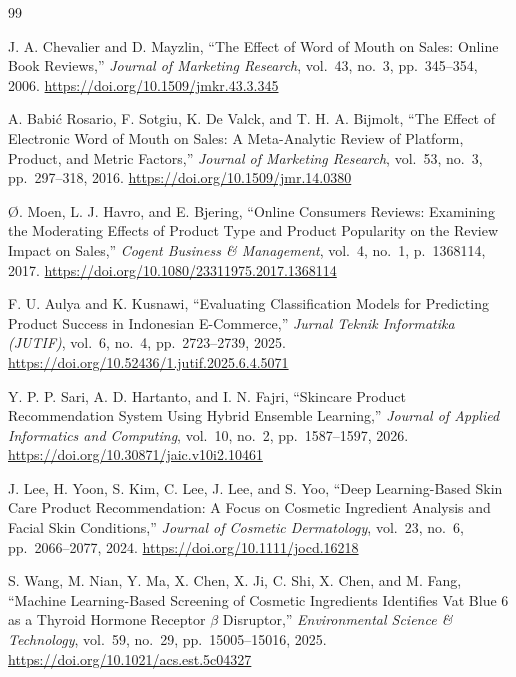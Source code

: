 \begin{thebibliography}{99}
\setlength{\itemsep}{3pt}

J. A. Chevalier and D. Mayzlin, ``The Effect of Word of Mouth on Sales: Online Book Reviews,'' \emph{Journal of Marketing Research}, vol.~43, no.~3, pp.~345--354, 2006. \url{https://doi.org/10.1509/jmkr.43.3.345}

A. Babi\'{c} Rosario, F. Sotgiu, K. De Valck, and T. H. A. Bijmolt, ``The Effect of Electronic Word of Mouth on Sales: A Meta-Analytic Review of Platform, Product, and Metric Factors,'' \emph{Journal of Marketing Research}, vol.~53, no.~3, pp.~297--318, 2016. \url{https://doi.org/10.1509/jmr.14.0380}

{\O}. Moen, L. J. Havro, and E. Bjering, ``Online Consumers Reviews: Examining the Moderating Effects of Product Type and Product Popularity on the Review Impact on Sales,'' \emph{Cogent Business \& Management}, vol.~4, no.~1, p.~1368114, 2017. \url{https://doi.org/10.1080/23311975.2017.1368114}

F. U. Aulya and K. Kusnawi, ``Evaluating Classification Models for Predicting Product Success in Indonesian E-Commerce,'' \emph{Jurnal Teknik Informatika (JUTIF)}, vol.~6, no.~4, pp.~2723--2739, 2025. \url{https://doi.org/10.52436/1.jutif.2025.6.4.5071}

Y. P. P. Sari, A. D. Hartanto, and I. N. Fajri, ``Skincare Product Recommendation System Using Hybrid Ensemble Learning,'' \emph{Journal of Applied Informatics and Computing}, vol.~10, no.~2, pp.~1587--1597, 2026. \url{https://doi.org/10.30871/jaic.v10i2.10461}

J. Lee, H. Yoon, S. Kim, C. Lee, J. Lee, and S. Yoo, ``Deep Learning-Based Skin Care Product Recommendation: A Focus on Cosmetic Ingredient Analysis and Facial Skin Conditions,'' \emph{Journal of Cosmetic Dermatology}, vol.~23, no.~6, pp.~2066--2077, 2024. \url{https://doi.org/10.1111/jocd.16218}

S. Wang, M. Nian, Y. Ma, X. Chen, X. Ji, C. Shi, X. Chen, and M. Fang, ``Machine Learning-Based Screening of Cosmetic Ingredients Identifies Vat Blue 6 as a Thyroid Hormone Receptor $\beta$ Disruptor,'' \emph{Environmental Science \& Technology}, vol.~59, no.~29, pp.~15005--15016, 2025. \url{https://doi.org/10.1021/acs.est.5c04327}


\end{thebibliography}
